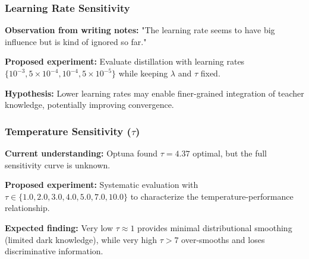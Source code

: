 \subsubsection{Learning Rate Sensitivity}

\textbf{Observation from writing notes:} "The learning rate seems to have big influence but is kind of ignored so far."

\textbf{Proposed experiment:} Evaluate distillation with learning rates $\{10^{-3}, 5 \times 10^{-4}, 10^{-4}, 5 \times 10^{-5}\}$ while keeping $\lambda$ and $\tau$ fixed.

\textbf{Hypothesis:} Lower learning rates may enable finer-grained integration of teacher knowledge, potentially improving convergence.

\subsubsection{Temperature Sensitivity ($\tau$)}

\textbf{Current understanding:} Optuna found $\tau = 4.37$ optimal, but the full sensitivity curve is unknown.

\textbf{Proposed experiment:} Systematic evaluation with $\tau \in \{1.0, 2.0, 3.0, 4.0, 5.0, 7.0, 10.0\}$ to characterize the temperature-performance relationship.

\textbf{Expected finding:} Very low $\tau \approx 1$ provides minimal distributional smoothing (limited dark knowledge), while very high $\tau > 7$ over-smooths and loses discriminative information.

